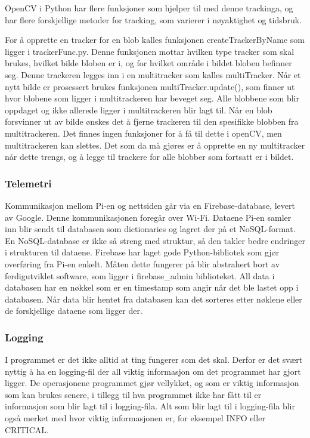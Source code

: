 OpenCV i Python har flere funksjoner som hjelper til med denne trackinga, og har flere forskjellige metoder for tracking, som varierer i nøyaktighet og tidsbruk.

For å opprette en tracker for en blob kalles funksjonen createTrackerByName som ligger i trackerFunc.py. Denne funksjonen mottar hvilken type tracker som skal brukes, hvilket bilde bloben er i, og for hvilket område i bildet bloben befinner seg. Denne trackeren legges inn i en multitracker som kalles multiTracker. Når et nytt bilde er prosessert brukes funksjonen multiTracker.update(), som finner ut hvor blobene som ligger i multitrackeren har beveget seg. Alle blobbene som blir oppdaget og ikke allerede ligger i multitrackeren blir lagt til. Når en blob forsvinner ut av bilde ønskes det å fjerne trackeren til den spesifikke blobben fra multitrackeren. Det finnes ingen funksjoner for å få til dette i openCV, men multitrackeren kan slettes. Det som da må gjøres er å opprette en ny multitracker når dette trengs, og å legge til trackere for alle blobber som fortsatt er i bildet.



\subsubsection{Telemetri}
\label{subsubsec:telemetri}

Kommunikasjon mellom Pi-en og nettsiden går via en Firebase-database, levert av Google. Denne kommunikasjonen foregår over Wi-Fi. Dataene Pi-en samler inn blir sendt til databasen som dictionaries og lagret der på et NoSQL-format. En NoSQL-database er ikke så streng med struktur, så den takler bedre endringer i strukturen til dataene. Firebase har laget gode Python-bibliotek som gjør overføring fra Pi-en enkelt. Måten dette fungerer på blir abstrahert bort av ferdigutviklet software, som ligger i firebase\_admin biblioteket. All data i databasen har en nøkkel som er en timestamp som angir når det ble lastet opp i databasen. Når data blir hentet fra databasen kan det sorteres etter nøklene eller de forskjellige dataene som ligger der.

\subsubsection{Logging}
I programmet er det ikke alltid at ting fungerer som det skal. Derfor er det svært nyttig å ha en logging-fil der all viktig informasjon om det programmet har gjort ligger. De operasjonene programmet gjør vellykket, og som er viktig informasjon som kan brukes senere, i tillegg til hva programmet ikke har fått til er informasjon som blir lagt til i logging-fila. Alt som blir lagt til i logging-fila blir også merket med hvor viktig informasjonen er, for eksempel INFO eller CRITICAL. 

